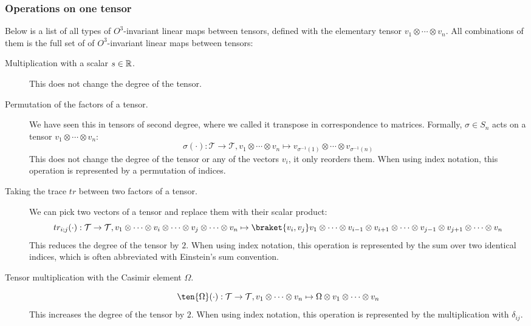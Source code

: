 \subsubsection{Operations on one tensor}\label{chap:tensorOperations}
Below is a list of all types of $O^3$-invariant linear maps between tensors, defined with the elementary tensor $v_1 \otimes \cdots \otimes v_n$. All combinations of them is the full set of of $O^3$-invariant linear maps between tensors:
\begin{description}
	\item[Multiplication with a scalar $s\in\mathbb{R}$.] This does not change the degree of the tensor.
	
	\item[Permutation of the factors of a tensor.] We have seen this in tensors of second degree, where we called it transpose in correspondence to matrices. Formally, $\sigma \in S_n$ acts on a tensor $v_1 \otimes \cdots \otimes v_n$:
	\[\sigma(\cdot): \mathcal{T}\to \mathcal{T}, v_1 \otimes \cdots \otimes v_n \mapsto v_{\sigma^{-1}(1)} \otimes \cdots \otimes v_{\sigma^{-1}(n)}\]
	This does not change the degree of the tensor or any of the vectors $v_i$, it only reorders them. When using index notation, this operation is represented by a permutation of indices.
	
	\item[Taking the trace $tr$ between two factors of a tensor.] We can pick two vectors of a tensor and replace them with their scalar product:
	\[tr_{i;j} (\cdot): \mathcal{T} \to \mathcal{T}, v_1 \otimes \cdots \otimes v_i \otimes \cdots \otimes v_j \otimes \cdots \otimes v_n \mapsto \braket{v_i,v_j} v_1 \otimes \cdots \otimes v_{i-1}\otimes v_{i+1} \otimes \cdots \otimes v_{j-1} \otimes v_{j+1} \otimes \cdots \otimes v_n\]
	This reduces the degree of the tensor by $2$. When using index notation, this operation is represented by the sum over two identical indices, which is often abbreviated with Einstein's sum convention.
	
	\item[Tensor multiplication with the Casimir element $\Omega$.]
	\[\ten{\Omega} (\cdot):  \mathcal{T}\to \mathcal{T}, v_1 \otimes \cdots \otimes v_n \mapsto \Omega \otimes v_{1} \otimes \cdots \otimes v_{n} \]
	This increases the degree of the tensor by $2$. When using index notation, this operation is represented by the multiplication with $\delta_{ij}$.
\end{description}

